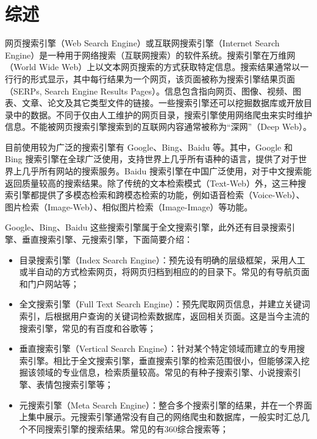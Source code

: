 \documentclass{ctexart}
\begin{document}
    \newpage

    \tableofcontents
    \newpage


    \section{综述}\label{sec:introduction}

    网页搜索引擎（Web Search Engine）或互联网搜索引擎（Internet Search Engine）是一种用于网络搜索（互联网搜索）的软件系统。搜索引擎在万维网（World Wide Web）上以文本网页搜索的方式获取特定信息。搜索结果通常以一行行的形式显示，其中每行结果为一个网页，该页面被称为搜索引擎结果页面（SERPs, Search Engine Results Pages）。信息包含指向网页、图像、视频、图表、文章、论文及其它类型文件的链接。一些搜索引擎还可以挖掘数据库或开放目录中的数据。不同于仅由人工维护的网页目录，搜索引擎使用网络爬虫来实时维护信息。不能被网页搜索引擎搜索到的互联网内容通常被称为“深网”（Deep Web）\cite{wikipedia-search-engine}。

    目前使用较为广泛的搜索引擎有 Google、Bing、Baidu 等。其中，Google 和 Bing 搜索引擎在全球广泛使用，支持世界上几乎所有语种的语言，提供了对于世界上几乎所有网站的搜索服务。Baidu 搜索引擎在中国广泛使用，对于中文搜索能返回质量较高的搜索结果。除了传统的文本检索模式（Text-Web）外，这三种搜索引擎都提供了多模态检索和跨模态检索的功能，例如语音检索（Voice-Web）、图片检索（Image-Web）、相似图片检索（Image-Image）等功能。

    Google、Bing、Baidu 这些搜索引擎属于全文搜索引擎，此外还有目录搜索引擎、垂直搜索引擎、元搜索引擎\cite{baike-search-engine}，下面简要介绍：

    \begin{itemize}
        \item 目录搜索引擎（Index Search Engine）：预先设有明确的层级框架，采用人工或半自动的方式检索网页，将网页归档到相应的的目录下。常见的有导航页面和门户网站等；
        \item 全文搜索引擎（Full Text Search Engine）：预先爬取网页信息，并建立关键词索引，后根据用户查询的关键词检索数据库，返回相关页面。这是当今主流的搜索引擎，常见的有百度和谷歌等；
        \item 垂直搜索引擎（Vertical Search Engine）：针对某个特定领域而建立的专用搜索引擎。相比于全文搜索引擎，垂直搜索引擎的检索范围很小，但能够深入挖掘该领域的专业信息，检索质量较高。常见的有种子搜索引擎、小说搜索引擎、表情包搜索引擎等；
        \item 元搜索引擎（Meta Search Engine）：整合多个搜索引擎的结果，并在一个界面上集中展示。元搜索引擎通常没有自己的网络爬虫和数据库，一般实时汇总几个不同搜索引擎的搜索结果。常见的有360综合搜索等；
    \end{itemize}
\end{document}

